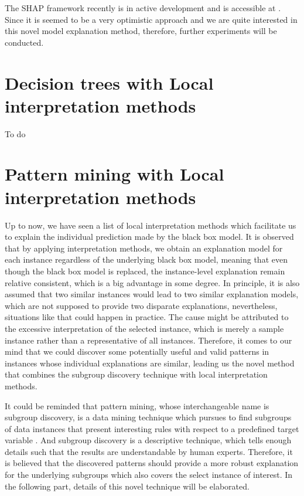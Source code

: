 The SHAP framework recently is in active development and is accessible at \cite{shap}. Since it is seemed to be a very optimistic approach and we are quite interested in this novel model explanation method, therefore, further experiments will be conducted. 

\section{Decision trees with Local interpretation methods}
To do

\section{Pattern mining with Local interpretation methods}

Up to now, we have seen a list of local interpretation methods which facilitate us to explain the individual prediction made by the black box model. It is observed that by applying interpretation methods, we obtain an explanation model for each instance regardless of the underlying black box model, meaning that even though the black box model is replaced, the instance-level explanation remain relative consistent, which is a big advantage in some degree. In principle, it is also assumed that two similar instances would lead to two similar explanation models, which are not supposed to provide two disparate explanations, nevertheless, situations like that could happen in practice. The cause might be attributed to the excessive interpretation of the selected instance, which is merely a sample instance rather than a representative of all instances. Therefore, it comes to our mind that we could discover some potentially useful and valid patterns in instances whose individual explanations are similar, leading us the novel method that combines the subgroup discovery technique with local interpretation methods. 

It could be reminded that pattern mining, whose interchangeable name is subgroup discovery, is a data mining technique which pursues to find subgroups of data instances that present interesting rules with respect to a predefined target variable \cite{herrera2011overview}. And subgroup discovery is a descriptive technique, which tells enough details such that the results are understandable by human experts. Therefore, it is believed that the discovered patterns should provide a more robust explanation for the underlying subgroups which also covers the select instance of interest. In the following part, details of this novel technique will be elaborated. 

